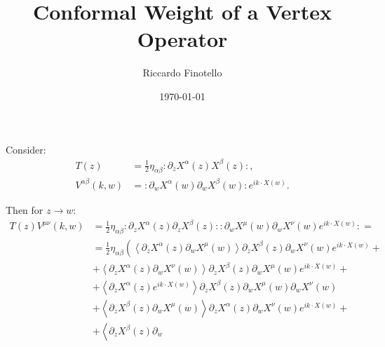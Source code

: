 \documentclass[10pt,a4paper]{article}
\author{Riccardo Finotello}
\title{Conformal Weight of a Vertex Operator}
\date{\today}
\begin{document}

    \maketitle

    Consider:
    \begin{align*}
        T\left( z \right) &= \frac{1}{2} \eta_{\alpha\beta} \colon \partial_z
        X^{\alpha}\left( z \right) X^{\beta}\left( z \right) \colon,
        \\
        V^{\alpha\beta}\left( k, w \right) &= \colon \partial_w
        X^{\alpha}\left( w \right) \partial_w X^{\beta}\left( w \right) \colon e^{i k
        \cdot X\left( w \right)}.
    \end{align*}

    Then for $z \to w$:
    \begin{align*}
        T\left( z \right) V^{\mu\nu}\left( k, w \right) &= \frac{1}{2}
        \eta_{\alpha\beta} \colon \partial_z X^{\alpha}\left( z \right)
        \partial_z X^{\beta}\left( z \right) \colon \colon \partial_w
        X^{\mu}\left( w \right) \partial_w X^{\nu}\left( w \right) e^{i k \cdot
        X\left( w \right)} \colon =
        \\
        &= \frac{1}{2} \eta_{\alpha\beta} \left( \left\langle \partial_z
        X^{\alpha}\left( z \right) \partial_w X^{\mu}\left( w \right)
        \right\rangle \partial_z X^{\beta}\left( z \right) \partial_w
        X^{\nu}\left( w \right) e^{i k \cdot X\left( w \right)} + \right.
        \\
        &\left. + \left\langle \partial_z X^{\alpha}\left( z \right) \partial_w
        X^{\nu}\left( w \right) \right\rangle \partial_z X^{\beta}\left( z
        \right) \partial_w X^{\mu}\left( w \right) e^{i k \cdot X\left( w
        \right)} + \right.
        \\
        &\left. + \left\langle \partial_z X^{\alpha}\left( z \right) e^{i k
        \cdot X\left( w \right)} \right\rangle \partial_z X^{\beta}\left( z
        \right) \partial_w X^{\mu}\left( w \right) \partial_w X^{\nu}\left( w
        \right) \right.
        \\
        &\left. + \left\langle \partial_z
        X^{\beta}\left( z \right) \partial_w X^{\mu}\left( w \right)
        \right\rangle \partial_z X^{\alpha}\left( z \right) \partial_w
        X^{\nu}\left( w \right) e^{i k \cdot X\left( w \right)} + \right.
        \\
        &\left. + \left\langle \partial_z X^{\beta}\left( z \right) \partial_w

\end{align*}
\end{document}
